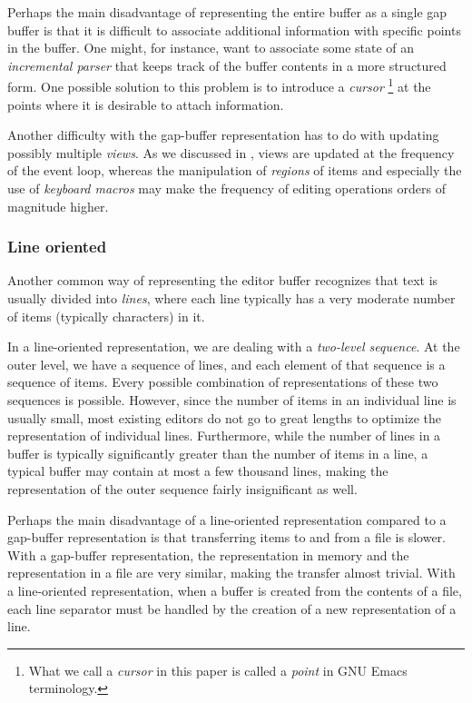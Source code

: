 Perhaps the main disadvantage of representing the entire buffer as a
single gap buffer is that it is difficult to associate additional
information with specific points in the buffer.  One might, for
instance, want to associate some state of an \emph{incremental parser}
that keeps track of the buffer contents in a more structured form.
One possible solution to this problem is to introduce a \emph{cursor}%
\footnote{What we call a \emph{cursor} in this paper is called a
  \emph{point} in GNU Emacs terminology.} at the points where it is
desirable to attach information.

Another difficulty with the gap-buffer representation has to do with
updating possibly multiple \emph{views}.  As we discussed in
, views are updated at the frequency of the
event loop, whereas the manipulation of \emph{regions} of items and
especially the use of \emph{keyboard macros} may make the frequency of
editing operations orders of magnitude higher.

\subsubsection{Line oriented}
\label{sec-previous-line-oriented}

Another common way of representing the editor buffer recognizes that
text is usually divided into \emph{lines}, where each line typically
has a very moderate number of items (typically characters) in it.

In a line-oriented representation, we are dealing with a
\emph{two-level sequence}.  At the outer level, we have a sequence of
lines, and each element of that sequence is a sequence of items.
Every possible combination of representations of these two sequences
is possible.  However, since the number of items in an individual line
is usually small, most existing editors do not go to great lengths to
optimize the representation of individual lines.  Furthermore, while
the number of lines in a buffer is typically significantly greater
than the number of items in a line, a typical buffer may contain at
most a few thousand lines, making the representation of the outer
sequence fairly insignificant as well.

Perhaps the main disadvantage of a line-oriented representation
compared to a gap-buffer representation is that transferring items to
and from a file is slower.  With a gap-buffer representation, the
representation in memory and the representation in a file are very
similar, making the transfer almost trivial.  With a line-oriented
representation, when a buffer is created from the contents of a file,
each line separator must be handled by the creation of a new
representation of a line.

